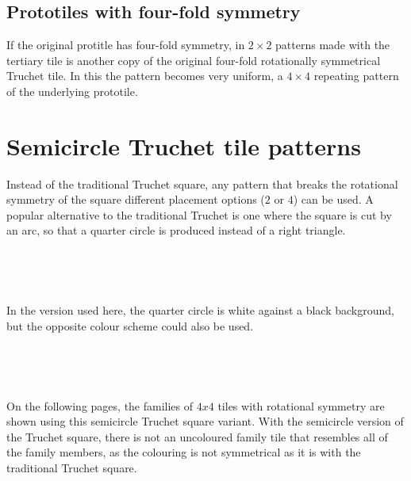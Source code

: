 \documentclass{tufte-book}
\begin{document}
\section{Prototiles with four-fold symmetry}

\noindent
If the original protitle has four-fold symmetry, in $2\times 2$ patterns made with the tertiary tile is another copy of the original four-fold rotationally symmetrical Truchet tile. In this the pattern becomes very uniform, a $4\times4$ repeating pattern of the underlying prototile.

{
\setlength{\tabcolsep}{0pt}
\renewcommand{\arraystretch}{0}

}
\chapter{Semicircle Truchet tile patterns}

\noindent
Instead of the traditional Truchet square, any pattern that breaks the rotational symmetry of the square different placement options ($2$ or $4$) can be used. A popular alternative to the traditional Truchet is one where the square is cut by an arc, so that a quarter circle is produced instead of a right triangle. 

\,
\vspace{0.3cm}

{
\setlength{\tabcolsep}{3pt}
\renewcommand{\arraystretch}{2}

}

\,
\vspace{0.3cm}

\noindent
In the version used here, the quarter circle is  white against a black background, but the opposite colour scheme could also be used.

\,
\vspace{0.3cm}

{
\setlength{\tabcolsep}{0pt}
\renewcommand{\arraystretch}{0}

}

\,
\vspace{0.3cm}

\noindent
On the following pages, the families of $4x4$  tiles with rotational symmetry are shown using this semicircle Truchet square variant. With the semicircle version of the Truchet square, there is not an uncoloured family tile that resembles all of the family members, as the colouring is not symmetrical as it is with the traditional Truchet square.

\newpage


\end{document}
